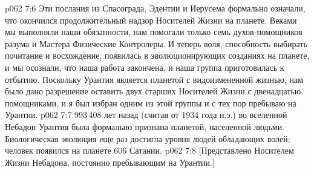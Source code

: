 \vs p062 7:6 Эти послания из Спасограда, Эдентии и Иерусема формально означали, что окончился продолжительный надзор Носителей Жизни на планете. Веками мы выполняли наши обязанности, нам помогали только семь духов\hyp{}помощников разума и Мастера Физические Контролеры. И теперь воля, способность выбирать почитание и восхождение, появилась в эволюционирующих созданиях на планете, и мы осознали, что наша работа закончена, и наша группа приготовилась к отбытию. Поскольку Урантия является планетой с видоизмененной жизнью, нам было дано разрешение оставить двух старших Носителей Жизни с двенадцатью помощниками, и я был избран одним из этой группы и с тех пор пребываю на Урантии.
\vs p062 7:7 993\,408 лет назад (считая от 1934 года н.э.) во вселенной Небадон Урантия была формально признана планетой, населенной людьми. Биологическая эволюция еще раз достигла уровня людей обладающих волей; человек появился на планете 606 Сатании.
\vsetoff
\vs p062 7:8 [Представлено Носителем Жизни Небадона, постоянно пребывающим на Урантии.]
